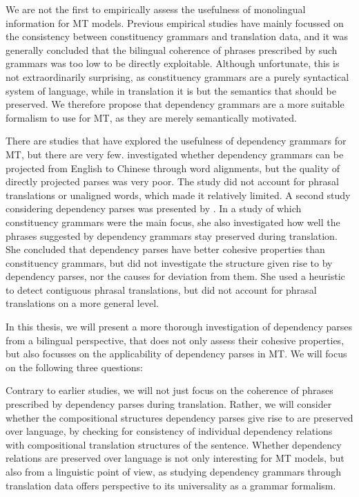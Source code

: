 We are not the first to empirically assess the usefulness of monolingual information for MT models. Previous empirical studies have mainly focussed on the consistency between constituency grammars and translation data, and it was generally concluded that the bilingual coherence of phrases prescribed by such grammars was too low to be directly exploitable. Although unfortunate, this is not extraordinarily surprising, as constituency grammars are a purely syntactical system of language, while in translation it is but the semantics that should be preserved. We therefore propose that dependency grammars are a more suitable formalism to use for MT, as they are merely semantically motivated.

There are studies that have explored the usefulness of dependency grammars for MT, but there are very few. \cite{hwa2002evaluating} investigated whether dependency grammars can be projected from English to Chinese through word alignments, but the quality of directly projected parses was very poor. The study did not account for phrasal translations or unaligned words, which made it relatively limited. A second study considering dependency parses was presented by \cite{fox2002phrasal}. In a study of which constituency grammars were the main focus, she also investigated how well the phrases suggested by dependency grammars stay preserved during translation. She concluded that dependency parses have better cohesive properties than constituency grammars, but did not investigate the structure given rise to by dependency parses, nor the causes for deviation from them. She used a heuristic to detect contiguous phrasal translations, but did not account for phrasal translations on a more general level.
 
In this thesis, we will present a more thorough investigation of dependency parses from a bilingual perspective, that does not only assess their cohesive properties, but also focusses on the applicability of dependency parses in MT. We will focus on the following three questions:

Contrary to earlier studies, we will not just focus on the coherence of phrases prescribed by dependency parses during translation. Rather, we will consider whether the compositional structures dependency parses give rise to are preserved over language, by checking for consistency of individual dependency relations with compositional translation structures of the sentence. Whether dependency relations are preserved over language is not only interesting for MT models, but also from a linguistic point of view, as studying dependency grammars through translation data offers perspective to its universality as a grammar formalism.\\

